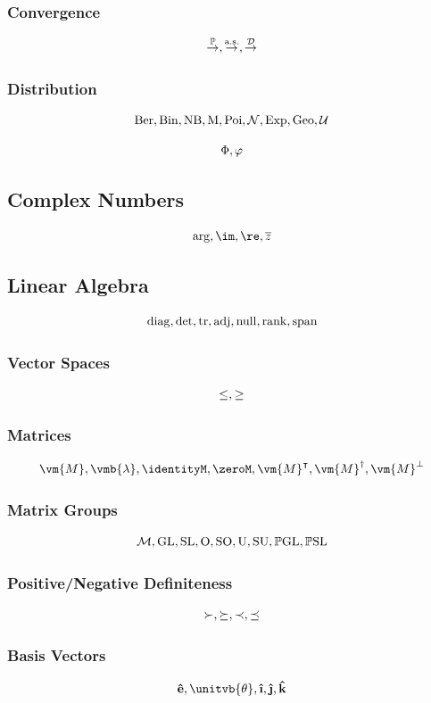 \documentclass{article}
\begin{document}
\subsubsection{Convergence}
\[
    \overset{\mathbb{P}}{\to}, \overset{\text{a.s.}}{\to}, \overset{\mathcal{D}}{\to}
\]

\subsubsection{Distribution}
\[
    \operatorname{Ber}, \operatorname{Bin}, \operatorname{NB}, \operatorname{M}, \operatorname{Poi}, \operatorname{\mathcal{N}}, \operatorname{Exp}, \operatorname{Geo}, \operatorname{\mathcal{U}}
\]

\[
    \Phi, \varphi
\]

\subsection{Complex Numbers}
\[
    \arg, \im, \re, \conjugate{z}
\]

\subsection{Linear Algebra}
\[
    \operatorname{diag}, \det, \tr, \operatorname{adj}, \operatorname{null}, \rank, \operatorname{span}
\]

\subsubsection{Vector Spaces}
\[
    \leq, \geq
\]

\subsubsection{Matrices}
\[
    \vm{M}, \vmb{\lambda}, \identityM, \zeroM, \vm{M}\transpose, \vm{M}\hermitian, \vm{M}\perppl
\]

\subsubsection{Matrix Groups}
\[
    \mathcal{M}, \operatorname{GL}, \operatorname{SL}, \operatorname{O}, \operatorname{SO}, \operatorname{U}, \operatorname{SU}, \mathbb{P}\mathrm{GL}, \mathbb{P}\mathrm{SL}
\]

\subsubsection{Positive/Negative Definiteness}
\[
    \succ, \succeq, \prec, \preceq
\]

\subsubsection{Basis Vectors}
\[
    \unitv{e}, \unitvb{\theta}, \ihat, \jhat, \khat
\]
\end{document}
